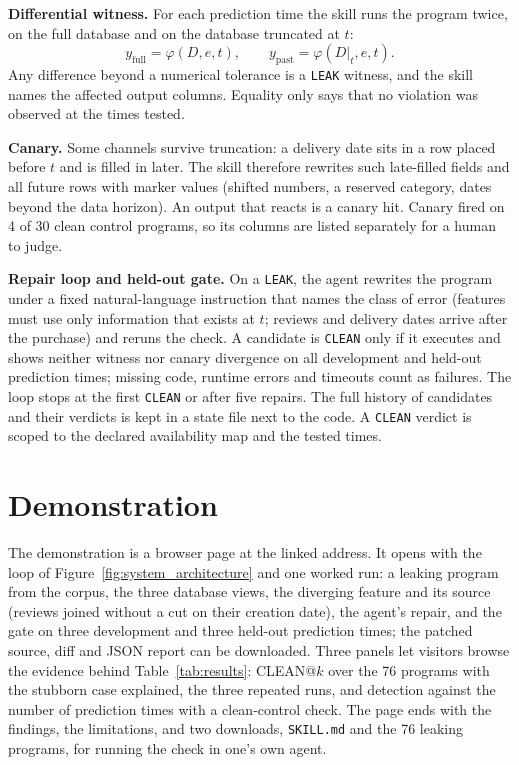 \documentclass[letterpaper]{article} %
\begin{document}
\textbf{Differential witness.}
For each prediction time the skill runs the program twice, on the full
database and on the database truncated at $t$:
\begin{equation}
  y_{\mathrm{full}} = \varphi(D,e,t), \qquad
  y_{\mathrm{past}} = \varphi(D|_t,e,t).
\end{equation}
Any difference beyond a numerical tolerance is a \texttt{LEAK} witness, and
the skill names the affected output columns. Equality only says that no
violation was observed at the times tested.

\textbf{Canary.}
Some channels survive truncation: a delivery date sits in a row placed
before $t$ and is filled in later. The skill therefore rewrites such
late-filled fields and all future rows with marker values (shifted numbers,
a reserved category, dates beyond the data horizon). An output that reacts
is a canary hit. Canary fired on 4 of 30 clean control programs, so its
columns are listed separately for a human to judge.

\textbf{Repair loop and held-out gate.}
On a \texttt{LEAK}, the agent rewrites the program under a fixed
natural-language instruction that names the class of error (features must
use only information that exists at $t$; reviews and delivery dates arrive
after the purchase) and reruns the check. A candidate is \texttt{CLEAN} only
if it executes and shows neither witness nor canary divergence on all
development and held-out prediction times; missing code, runtime errors and
timeouts count as failures. The loop stops at the first \texttt{CLEAN} or
after five repairs. The full history of candidates and their verdicts is
kept in a state file next to the code. A \texttt{CLEAN} verdict is scoped to
the declared availability map and the tested times.

\section{Demonstration}

The demonstration is a browser page at the linked address. It opens with
the loop of Figure~\ref{fig:system_architecture} and one worked run: a
leaking program from the corpus, the three database views, the diverging
feature and its source (reviews joined without a cut on their creation
date), the agent's repair, and the gate on three development and three
held-out prediction times; the patched source, diff and JSON report can be
downloaded. Three panels let visitors browse the evidence behind
Table~\ref{tab:results}: CLEAN@$k$ over the 76 programs with the stubborn
case explained, the three repeated runs, and detection against the number
of prediction times with a clean-control check. The page ends with the
findings, the limitations, and two downloads, \texttt{SKILL.md} and the 76
leaking programs, for running the check in one's own agent.
\end{document}
